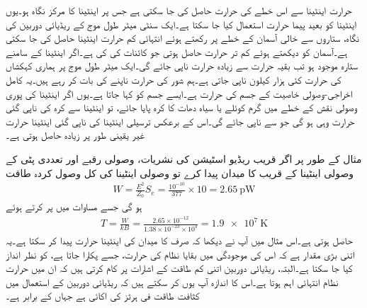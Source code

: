 حرارت اینٹینا سے اس خطے کی حرارت حاصل کی جا سکتی ہے جس پر اینٹینا کا مرکز نگاہ ہو۔یوں اینٹینا کو بعید پیما حرارت استعمال کیا جا سکتا ہے۔ایک سنٹی میٹر طول موج کے ریڈیائی دوربین کی نگاہ، ستاروں سے خالی آسمان کے خطے پر رکھتے ہوئے انتہائی کم حرارت اینٹینا   حاصل کی جا سکتی ہے۔آسمان کو دیکھتے ہوئے کم تر حرارت  حاصل ہوتی جو کائنات کی  کی  ہے۔اگر اینٹینا کے سامنے ستارہ موجود ہو تب بقیہ حرارت سے زیادہ حرارت ناپی جائے گی۔ایک میٹر طول موج پر ہماری کہکشاں کی حرارت کئی ہزار کیلون ناپی جاتی ہے۔ہم  شور کی حرارت ناپنے کی بات کر رہے ہیں۔یہ کامل اخراجی-وصولی خاصیت کے جسم کی حرارت ہے۔ایسے جسم کو   کہا جاتا ہے۔یوں اگر اینٹینا کی پوری وصولی نقش کے خطے میں گرم کوئلے یا سیاہ دھات کا کرہ پایا جائے، تو اینٹینا سے کرہ کی ناپی گئی حرارت وہی ہو گی جو  سے ناپی جائے گی۔اس کے  برعکس ترسیلی اینٹینا کی ناپی گئی اینٹینا حرارت غیر یقینی طور پر زیادہ حاصل ہوتی ہے۔   

مثال کے طور پر  اگر قریب ریڈیو اسٹیشن کی نشریات،  وصولی رقبے اور  تعددی پٹی کے وصولی اینٹینا کے قریب  کا میدان پیدا کرے تو وصولی اینٹینا کی کل وصول کردہ طاقت
\begin{align*}
W=\frac{E^2}{Z_0} S_e=\frac{10^{-10}}{377} \times 10=\SI{2.65}{\pico \watt}
\end{align*}
ہو گی جسے مساوات  میں پر کرتے ہوئے
\begin{align*}
T=\frac{W}{k B}=\frac{2.65\times 10^{-12}}{1.38\times 10^{-23}\times 10^4}=\SI{1.9e7}{\kelvin}
\end{align*}
حاصل ہوتی ہے۔اس مثال میں آپ نے دیکھا کہ صرف  کا میدان   کی اینٹینا حرارت پیدا کر سکتا ہے۔یہ اتنی بڑی مقدار ہے کہ اس کی موجودگی میں بقایا نظام کی حرارت، جسے  پکارا جاتا ہے، کو نظر انداز کیا جا سکتا ہے۔البتہ، ریڈیائی دوربین اتنی کم طاقت کے اشارات پر کام کرتی ہیں کہ ان میں حرارت نظام انتہائی اہم ہوتا ہے۔اس کا اندازہ آپ یوں کر سکتے ہیں کہ ریڈیائی دوربین کے استعمال میں کثافت طاقت فی ہرٹز کی اکائی  ہے جہاں  کے برابر ہے۔

